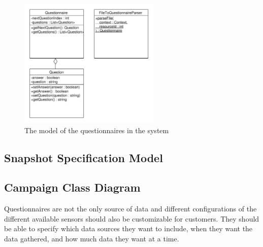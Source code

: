 \begin{figure}[!htbp]
	\centering
	\includegraphics[width=0.6\textwidth]{graphic/data_modeling/questionnaire.pdf}
	\caption{The model of the questionnaires in the system}
	\label{fig:questionnaire_model}
\end{figure}
\FloatBarrier

\subsection{Snapshot Specification Model}
\label{sub:snapshot_specification_model}


\subsection{Campaign Class Diagram}
\label{sub:campagin_class_diagram}

Questionnaires are not the only source of data and different configurations of the different available sensors should also be customizable for customers. They should be able to specify which data sources they want to include, when they want the data gathered, and how much data they want at a time. 

